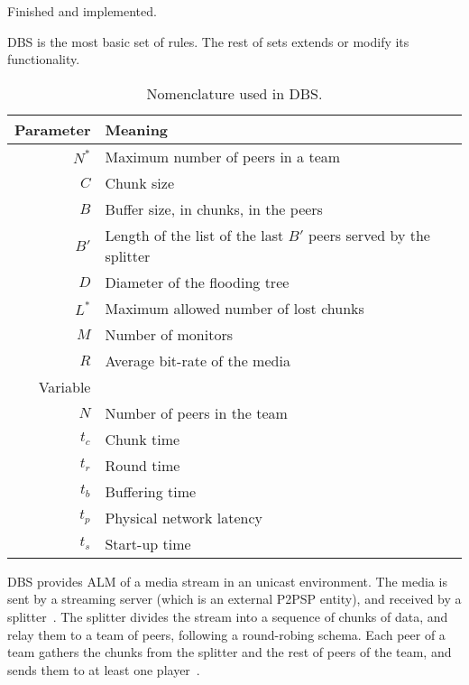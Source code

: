 
\label{sec:DBS}

\begin{notex}
  Finished and implemented.
\end{notex}

\acrshort{DBS} is the most basic set of rules. The rest of sets extends or modify
its functionality.

\begin{table}
  \centering
  \begin{tabular}{rl}
    Parameter & Meaning \\
    \hline
    $N^*$  & Maximum number of peers in a team \\
    $C$    & Chunk size \\
    $B$    & Buffer size, in chunks, in the peers \\
    $B'$   & Length of the list of the last $B'$ peers served by the splitter \\ 
    $D$    & Diameter of the flooding tree \\
    $L^*$  & Maximum allowed number of lost chunks \\
    $M$    & Number of monitors \\
    $R$    & Average bit-rate of the media \\
    Variable & \\
    \hline
    $N$    & Number of peers in the team \\
    $t_c$  & Chunk time \\
    $t_r$  & Round time \\
    $t_b$  & Buffering time \\
    $t_p$  & Physical network latency \\
    $t_s$  & Start-up time
  \end{tabular}
  \caption{Nomenclature used in DBS.} %
  \label{tab:DBS_nomenclature}
\end{table}

DBS provides \acrshort{ALM} of a \gls{media} \gls{stream} in an
\gls{unicast} environment. The media is sent by a streaming
\gls{server} (which is an external P2PSP entity), and received by a
\gls{splitter}~. The splitter divides
the stream into a sequence of \gls{chunk}s of data, and relay them to
a \gls{team} of peers, following a round-robing schema. Each peer of a
team gathers the chunks from the splitter and the rest of peers of the
team, and sends them to at least one \gls{player}~.

